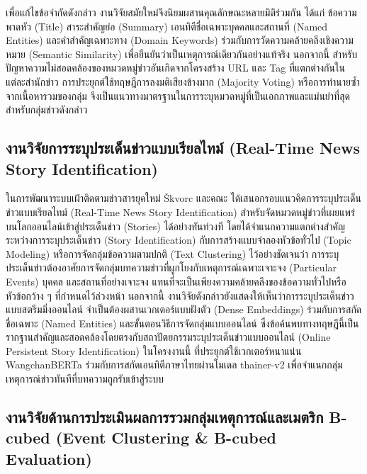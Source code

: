 เพื่อแก้ไขข้อจำกัดดังกล่าว งานวิจัยสมัยใหม่จึงนิยมผสานคุณลักษณะหลายมิติร่วมกัน ได้แก่ ข้อความพาดหัว (Title) สาระสำคัญย่อ (Summary) เอนทิตีชื่อเฉพาะบุคคลและสถานที่ (Named Entities) และคำสำคัญเฉพาะทาง (Domain Keywords) ร่วมกับการวัดความคล้ายคลึงเชิงความหมาย (Semantic Similarity) เพื่อยืนยันว่าเป็นเหตุการณ์เดียวกันอย่างแท้จริง นอกจากนี้ สำหรับปัญหาความไม่สอดคล้องของหมวดหมู่ข่าวอันเกิดจากโครงสร้าง URL และ Tag ที่แตกต่างกันในแต่ละสำนักข่าว การประยุกต์ใช้ทฤษฎีการลงมติเสียงข้างมาก (Majority Voting) หรือการทำนายซ้ำจากเนื้อหารวมของกลุ่ม จึงเป็นแนวทางมาตรฐานในการระบุหมวดหมู่ที่เป็นเอกภาพและแม่นยำที่สุดสำหรับกลุ่มข่าวดังกล่าว

\subsection{งานวิจัยการระบุประเด็นข่าวแบบเรียลไทม์ (Real-Time News Story Identification)}

ในการพัฒนาระบบเฝ้าติดตามข่าวสารยุคใหม่ Škvorc และคณะ \cite{skvorc2025realtime} ได้เสนอกรอบแนวคิดการระบุประเด็นข่าวแบบเรียลไทม์ (Real-Time News Story Identification) สำหรับจัดหมวดหมู่ข่าวที่เผยแพร่บนโลกออนไลน์เข้าสู่ประเด็นข่าว (Stories) ได้อย่างทันท่วงที โดยได้จำแนกความแตกต่างสำคัญระหว่างการระบุประเด็นข่าว (Story Identification) กับการสร้างแบบจำลองหัวข้อทั่วไป (Topic Modeling) หรือการจัดกลุ่มข้อความตามปกติ (Text Clustering) ไว้อย่างชัดเจนว่า การระบุประเด็นข่าวต้องอาศัยการจัดกลุ่มบทความข่าวที่ผูกโยงกับเหตุการณ์เฉพาะเจาะจง (Particular Events) บุคคล และสถานที่อย่างเจาะจง แทนที่จะเป็นเพียงความคล้ายคลึงของข้อความทั่วไปหรือหัวข้อกว้าง ๆ ที่กำหนดไว้ล่วงหน้า นอกจากนี้ งานวิจัยดังกล่าวยังแสดงให้เห็นว่าการระบุประเด็นข่าวแบบสตรีมมิ่งออนไลน์ จำเป็นต้องผสานเวกเตอร์แบบฝังตัว (Dense Embeddings) ร่วมกับการสกัดชื่อเฉพาะ (Named Entities) และขั้นตอนวิธีการจัดกลุ่มแบบออนไลน์ ซึ่งข้อค้นพบทางทฤษฎีนี้เป็นรากฐานสำคัญและสอดคล้องโดยตรงกับสถาปัตยกรรมระบุประเด็นข่าวแบบออนไลน์ (Online Persistent Story Identification) ในโครงงานนี้ ที่ประยุกต์ใช้เวกเตอร์หนาแน่น WangchanBERTa ร่วมกับการสกัดเอนทิตีภาษาไทยผ่านโมเดล thainer-v2 เพื่อจำแนกกลุ่มเหตุการณ์ข่าวทันทีที่บทความถูกรับเข้าสู่ระบบ

\subsection{งานวิจัยด้านการประเมินผลการรวมกลุ่มเหตุการณ์และเมตริก B-cubed (Event Clustering \& B-cubed Evaluation)}

